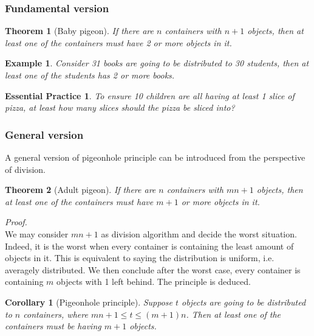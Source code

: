 \documentclass[12pt]{article}
\newtheorem*{theorem}{Theorem}
\newtheorem*{corollary}{Corollary}
\newtheorem*{example}{Example}
\newtheorem{exercise}{Essential Practice}[subsection]
\renewenvironment{proof}[1][Proof]{\begin{snugshade*} \textit{{#1}.}\\}{\hfill \qedsymbol \end{snugshade*}}
\begin{document}
    \subsubsection*{Fundamental version}

    \begin{theorem}[Baby pigeon]
        If there are $n$ containers with $n+1$ objects, then at least one of the containers must have 2 or more objects in it.
    \end{theorem}

    \begin{example}
        Consider 31 books are going to be distributed to 30 students, then at least one of the students has 2 or more books.
    \end{example}

    \begin{exercise}
        To ensure 10 children are all having at least 1 slice of pizza, at least how many slices should the pizza be sliced into?
    \end{exercise}

    \subsubsection*{General version}

    A general version of pigeonhole principle can be introduced from the perspective of division.

    \begin{theorem}[Adult pigeon]
        If there are $n$ containers with $mn+1$ objects, then at least one of the containers must have $m+1$ or more objects in it.
    \end{theorem}

    \begin{proof}
        We may consider $mn+1$ as division algorithm and decide the worst situation. Indeed, it is the worst when every container is containing the least amount of objects in it. This is equivalent to saying the distribution is uniform, i.e. averagely distributed. We then conclude after the worst case, every container is containing $m$ objects with 1 left behind. The principle is deduced.
    \end{proof}

    \begin{corollary}[Pigeonhole principle]
        Suppose $t$ objects are going to be distributed to $n$ containers, where $mn+1\leq t\leq (m+1)n$. Then at least one of the containers must be having $m+1$ objects.
    \end{corollary}
\end{document}
